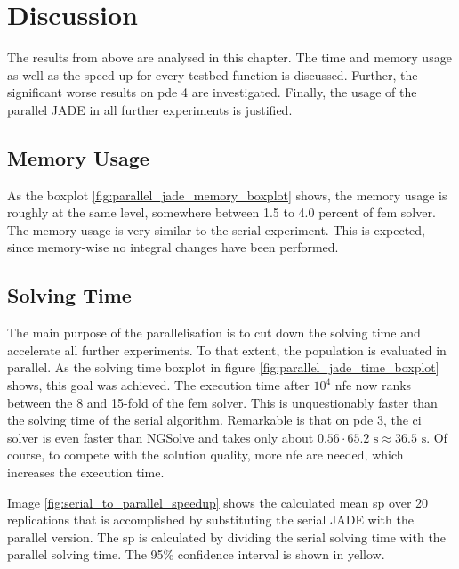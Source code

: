 \documentclass[./\jobname.tex]{subfiles}
\begin{document}
\section{Discussion}

The results from above are analysed in this chapter. The time and memory usage as well as the speed-up for every testbed function is discussed. Further, the significant worse results on \gls{pde} 4 are investigated. Finally, the usage of the parallel JADE in all further experiments is justified. 

\subsection{Memory Usage}
As the boxplot \ref{fig:parallel_jade_memory_boxplot} shows, the memory usage is roughly at the same level, somewhere between 1.5 to 4.0 percent of \gls{fem} solver. The memory usage is very similar to the serial experiment. This is expected, since memory-wise no integral changes have been performed.  

\subsection{Solving Time}
The main purpose of the parallelisation is to cut down the solving time and accelerate all further experiments. To that extent, the population is evaluated in parallel. As the solving time boxplot in figure \ref{fig:parallel_jade_time_boxplot} shows, this goal was achieved. The execution time after $10^4$ \gls{nfe} now ranks between the 8 and 15-fold of the \gls{fem} solver. This is unquestionably faster than the solving time of the serial algorithm. Remarkable is that on \gls{pde} 3, the \gls{ci} solver is even faster than NGSolve and takes only about $0.56 \cdot 65.2 \text{ s} \approx 36.5 \text{ s}$. Of course, to compete with the solution quality, more \gls{nfe} are needed, which increases the execution time. 

Image \ref{fig:serial_to_parallel_speedup} shows the calculated mean \gls{sp} over 20 replications that is accomplished by substituting the serial JADE with the parallel version. The \gls{sp} is calculated by dividing the serial solving time with the parallel solving time. The 95\% confidence interval is shown in yellow. 
\end{document}
